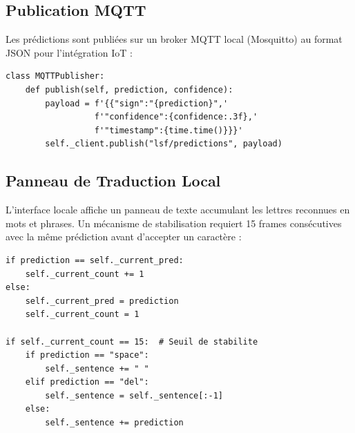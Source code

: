 \subsection{Publication MQTT}

Les prédictions sont publiées sur un broker MQTT local (Mosquitto) au format JSON pour l'intégration IoT :

\begin{lstlisting}[style=python, caption={Publication MQTT}]
class MQTTPublisher:
    def publish(self, prediction, confidence):
        payload = f'{{"sign":"{prediction}",'
                  f'"confidence":{confidence:.3f},'
                  f'"timestamp":{time.time()}}}'
        self._client.publish("lsf/predictions", payload)
\end{lstlisting}

\subsection{Panneau de Traduction Local}

L'interface locale affiche un panneau de texte accumulant les lettres reconnues en mots et phrases. Un mécanisme de stabilisation requiert 15 frames consécutives avec la même prédiction avant d'accepter un caractère :

\begin{lstlisting}[style=python, caption={Accumulation de texte}]
if prediction == self._current_pred:
    self._current_count += 1
else:
    self._current_pred = prediction
    self._current_count = 1

if self._current_count == 15:  # Seuil de stabilite
    if prediction == "space":
        self._sentence += " "
    elif prediction == "del":
        self._sentence = self._sentence[:-1]
    else:
        self._sentence += prediction
\end{lstlisting}
